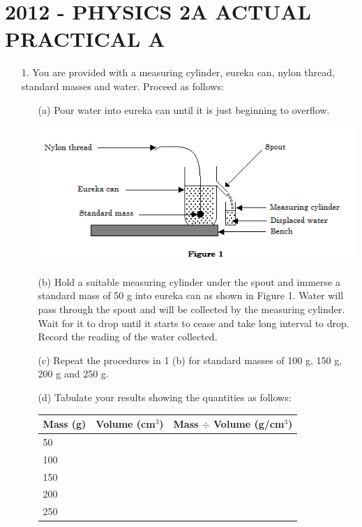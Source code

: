 \chapter{2012 - PHYSICS 2A ACTUAL PRACTICAL A}

\begin{enumerate}
\item[1.] You are provided with a measuring cylinder, eureka can, nylon thread, standard masses and water. Proceed as follows:
\begin{enumerate}
\item[(a)] Pour water into eureka can until it is just beginning to overflow.

\begin{center}
\includegraphics[width=13cm]{./img/2012-1-alt.png}
\end{center}

\item[(b)] Hold a suitable measuring cylinder under the spout and immerse a standard mass of 50 g into eureka can as shown in Figure 1. Water will pass through the spout and will be collected by the measuring cylinder. Wait for it to drop until it starts to cease and take long interval to drop. Record the reading of the water collected.
\item[(c)] Repeat the procedures in 1 (b) for standard masses of 100 g, 150 g, 200 g and 250 g.
\item[(d)] Tabulate your results showing the quantities as follows:\\

\begin{tabular}{|p{4cm}|p{4cm}|p{4cm}|}\hline
Mass (g) & Volume (cm$^3$) & Mass $\div$ Volume (g/cm$^3$) \\ \hline
50 & & \\ \hline
100 & & \\ \hline
150 & & \\ \hline
200 & & \\ \hline
250 & & \\ \hline
\end{tabular}\\[10pt]


\end{enumerate}
\end{enumerate}
